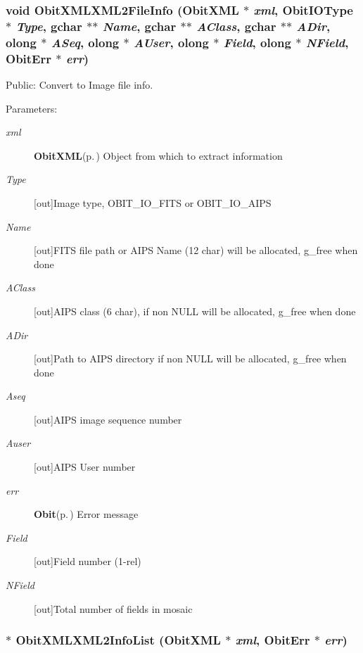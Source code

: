 \subsubsection{\setlength{\rightskip}{0pt plus 5cm}void Obit\-XMLXML2File\-Info ({\bf Obit\-XML} $\ast$ {\em xml}, Obit\-IOType $\ast$ {\em Type}, gchar $\ast$$\ast$ {\em Name}, gchar $\ast$$\ast$ {\em AClass}, gchar $\ast$$\ast$ {\em ADir}, {\bf olong} $\ast$ {\em ASeq}, {\bf olong} $\ast$ {\em AUser}, {\bf olong} $\ast$ {\em Field}, {\bf olong} $\ast$ {\em NField}, {\bf Obit\-Err} $\ast$ {\em err})}\label{ObitXML_8c_a20}


Public: Convert to Image file info. 

\begin{Desc}
\item[Parameters:]
\begin{description}
\item[{\em xml}]{\bf Obit\-XML}{\rm (p.\,\pageref{structObitXML})} Object from which to extract information \item[{\em Type}][out]Image type, OBIT\_\-IO\_\-FITS or OBIT\_\-IO\_\-AIPS \item[{\em Name}][out]FITS file path or AIPS Name (12 char) will be allocated, g\_\-free when done \item[{\em AClass}][out]AIPS class (6 char), if non NULL will be allocated, g\_\-free when done \item[{\em ADir}][out]Path to AIPS directory if non NULL will be allocated, g\_\-free when done \item[{\em Aseq}][out]AIPS image sequence number \item[{\em Auser}][out]AIPS User number \item[{\em err}]{\bf Obit}{\rm (p.\,\pageref{structObit})} Error message \item[{\em Field}][out]Field number (1-rel) \item[{\em NField}][out]Total number of fields in mosaic \end{description}
\end{Desc}
\subsubsection{$\ast$ Obit\-XMLXML2Info\-List ({\bf Obit\-XML} $\ast$ {\em xml}, {\bf Obit\-Err} $\ast$ {\em err})}\label{ObitXML_8c_a17}


